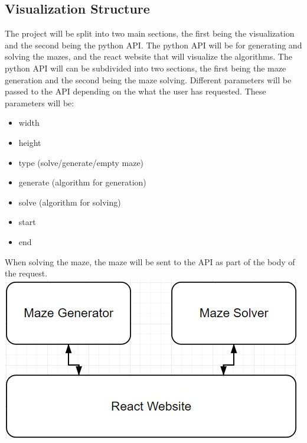 \documentclass{article}
\begin{document}
\subsection{Visualization Structure}
The project will be split into two main sections, the first being the visualization and the second being the python API.
The python API will be for generating and solving the mazes, and the react website that will visualize the algorithms. The python API will can be subdivided into two sections, the first being the maze generation and the second being the maze solving. Different parameters will be passed to the API depending on the what the user has requested. These parameters will be:
\begin{itemize}
    \item width
    \item height
    \item type (solve/generate/empty maze)
    \item generate (algorithm for generation)
    \item solve (algorithm for solving)
    \item start
    \item end
\end{itemize} 

When solving the maze, the maze will be sent to the API as part of the body of the request.
\newline
\includegraphics[width=\linewidth]{assets/structure.jpg}
\end{document}
